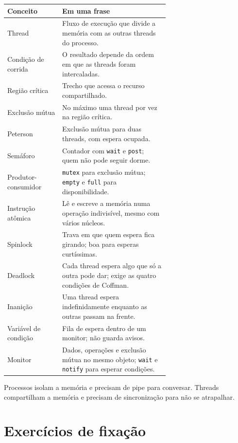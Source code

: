 \documentclass[11pt,a4paper]{article}
\newcommand{\cmd}[1]{\texttt{#1}}
\begin{document}
\begin{center}
\begin{tabular}{@{}lR{0.66\linewidth}@{}}
\toprule
\textbf{Conceito} & \textbf{Em uma frase} \\
\midrule
Thread & Fluxo de execução que divide a memória com as outras threads do processo. \\
Condição de corrida & O resultado depende da ordem em que as threads foram intercaladas. \\
Região crítica & Trecho que acessa o recurso compartilhado. \\
Exclusão mútua & No máximo uma thread por vez na região crítica. \\
Peterson & Exclusão mútua para duas threads, com espera ocupada. \\
Semáforo & Contador com \cmd{wait} e \cmd{post}; quem não pode seguir dorme. \\
Produtor-consumidor & \cmd{mutex} para exclusão mútua; \cmd{empty} e \cmd{full} para disponibilidade. \\
Instrução atômica & Lê e escreve a memória numa operação indivisível, mesmo com vários núcleos. \\
Spinlock & Trava em que quem espera fica girando; boa para esperas curtíssimas. \\
Deadlock & Cada thread espera algo que só a outra pode dar; exige as quatro condições de Coffman. \\
Inanição & Uma thread espera indefinidamente enquanto as outras passam na frente. \\
Variável de condição & Fila de espera dentro de um monitor; não guarda avisos. \\
Monitor & Dados, operações e exclusão mútua no mesmo objeto; \cmd{wait} e \cmd{notify} para esperar condições. \\
\bottomrule
\end{tabular}
\end{center}

\begin{definicao}
Processos isolam a memória e precisam de pipe para conversar. Threads compartilham a memória e precisam de sincronização para não se atrapalhar.
\end{definicao}

\section{Exercícios de fixação}
\end{document}

